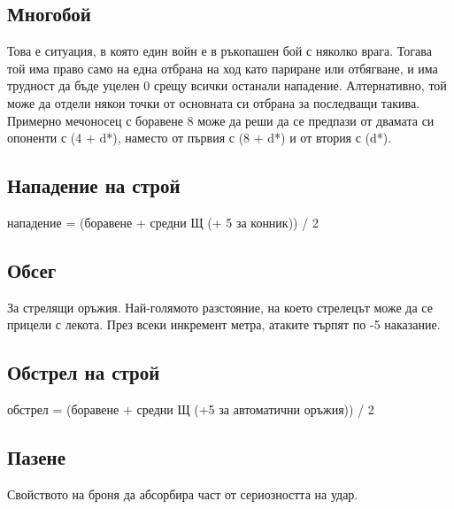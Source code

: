 \subsection{Многобой}
Това е ситуация, в която един войн е в ръкопашен бой с няколко врага.
Тогава той има право само на една отбрана на ход като париране или отбягване, и има трудност да бъде уцелен 0 срещу всички останали нападение.
Алтернативно, той може да отдели някои точки от основната си отбрана за последващи такива.
Примерно мечоносец с боравене 8 може да реши да се предпази от двамата си опоненти с (4 + d*), наместо от първия с (8 + d*) и от втория с (d*).


\subsection{Нападение на строй}
нападение = (боравене + средни Щ (+ 5 за конник)) / 2


\subsection{Обсег}
За стрелящи оръжия.
Най-голямото разстояние, на което стрелецът може да се прицели с лекота.
През всеки инкремент метра, атаките търпят по -5 наказание.


\subsection{Обстрел на строй}
обстрел = (боравене + средни Щ (+5 за автоматични оръжия)) / 2






\subsection{Пазене}
Свойството на броня да абсорбира част от сериозността на удар.


